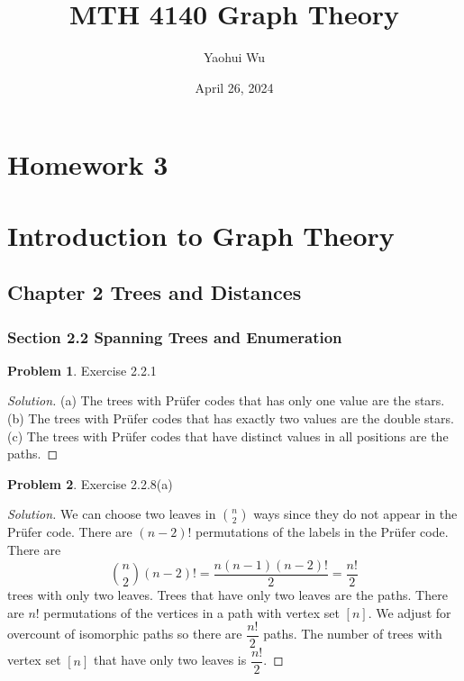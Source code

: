 \documentclass[12pt]{article}
\title{MTH 4140 Graph Theory}
\author{Yaohui Wu}
\date{April 26, 2024}
\theoremstyle{definition}
\newtheorem{problem}{Problem}
\newenvironment*{solution}{\begin{proof}[Solution]}{\end{proof}}
\begin{document}
\maketitle
\section*{Homework 3}
\section*{Introduction to Graph Theory}

\subsection*{Chapter 2 Trees and Distances}
\subsubsection*{Section 2.2 Spanning Trees and Enumeration}
\begin{problem}
    Exercise 2.2.1
\end{problem}
\begin{solution}
    (a) The trees with Prüfer codes that has only one value are the stars. (b)
    The trees with Prüfer codes that has exactly two values are the double
    stars. (c) The trees with Prüfer codes that have distinct values in all
    positions are the paths.
\end{solution}
\begin{problem}
    Exercise 2.2.8(a)
\end{problem}
\begin{solution}
    We can choose two leaves in \(\binom{n}{2}\) ways since they do not appear
    in the Prüfer code. There are \((n-2)!\) permutations of the labels in the
    Prüfer code. There are
    \[\binom{n}{2}(n-2)! = \frac{n(n-1)(n-2)!}{2} = \frac{n!}{2}\]
    trees with only two leaves. Trees that have only two leaves are
    the paths. There are \(n!\) permutations of the vertices in a path with
    vertex set \([n]\). We adjust for overcount of isomorphic paths so there
    are \(\dfrac{n!}{2}\) paths. The number of trees with vertex set \([n]\)
    that have only two leaves is \(\dfrac{n!}{2}\).
\end{solution}
\end{document}
